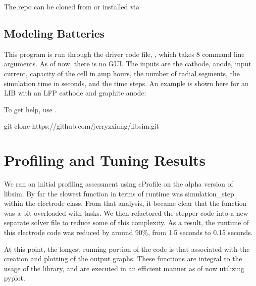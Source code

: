 \documentclass[letterpaper,10pt,english]{sphinxmanual}
\begin{document}
\sphinxAtStartPar
The repo can be cloned from  or
installed via

\sphinxAtStartPar
{}


\section{Modeling Batteries}
\label{\detokenize{usage:modeling-batteries}}
\sphinxAtStartPar
This program is run through the driver code file, , which takes 8
command line arguments. As of now, there is no GUI. The inputs are the cathode,
anode, input current, capacity of the cell in amp hours, the number of radial
segments, the simulation time in seconds, and the time steps. An example is
shown here for an LIB with an LFP cathode and graphite anode:

\sphinxAtStartPar
{}

\sphinxAtStartPar
To get help, use .

\begin{sphinxVerbatim}[commandchars=\\\{\}]
git clone https://github.com/jerryzxiang/libsim.git
\end{sphinxVerbatim}


\chapter{Profiling and Tuning Results}
\label{\detokenize{profiling:profiling-and-tuning-results}}\label{\detokenize{profiling::doc}}
\sphinxAtStartPar
We ran an initial profiling assessment using cProfile on the alpha version of libsim.
By far the slowest function in terms of runtime was simulation\_step within the electrode
class. From that analysis, it became clear that the function was a bit overloaded with
tasks. We then refactored the stepper code into a new separate solver file to reduce
some of this complexity. As a result, the runtime of this electrode code was reduced
by around 90\%, from 1.5 seconds to 0.15 seconds.

\sphinxAtStartPar
At this point, the longest running portion of the code is that associated with the
creation and plotting of the output graphs. These functions are integral to the
usage of the library, and are executed in an efficient manner as of now utilizing pyplot.
\end{document}
